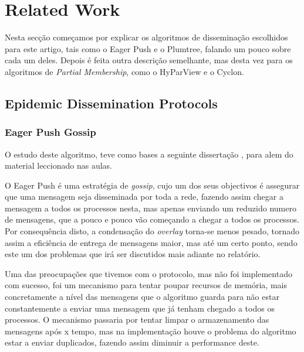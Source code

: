 \section{Related Work}


Nesta secção começamos por explicar os algoritmos de disseminação escolhidos para este artigo, tais como o Eager Push e o Plumtree, falando um pouco sobre cada um deles.
Depois é feita outra descrição semelhante, mas desta vez para os algoritmos de \textit{Partial Membership}, como o HyParView e o Cyclon.

\subsection{Epidemic Dissemination Protocols}

\subsubsection{Eager Push Gossip}
O estudo deste algoritmo, teve como bases a seguinte dissertação \cite{leitao}, para alem do material leccionado nas aulas.

O Eager Push é uma estratégia de \textit{gossip}, cujo um dos seus objectivos é assegurar que uma mensagem seja disseminada por toda a rede, fazendo assim chegar a mensagem a todos os processos nesta, mas apenas enviando um reduzido numero de mensagens, que a pouco e pouco vão começando a chegar a todos os processos. Por consequência disto, a condensação do \textit{overlay} torna-se menos pesado, tornado assim a eficiência de entrega de mensagens maior, mas até um certo ponto, sendo este um dos problemas que irá ser discutidos mais adiante no relatório.

Uma das preocupações que tivemos com o protocolo, mas não foi implementado com sucesso, foi um mecanismo para tentar poupar recursos de memória, mais concretamente a nível das mensagens que o algoritmo guarda para não estar constantemente a enviar uma mensagem que já tenham chegado a todos os processos. O mecanismo passaria por tentar limpar o armazenamento das mensagens após x tempo, mas na implementação houve o problema do algoritmo estar a enviar duplicados, fazendo assim diminuir a performance deste.

